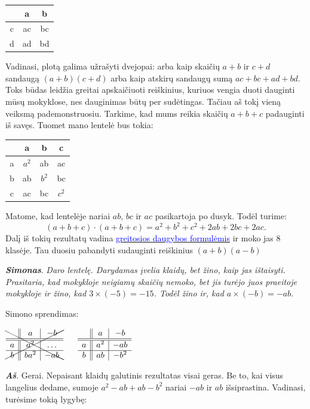 \documentclass[a4paper]{article}
\newcommand{\goto}[2]{\href{\detokenize{#1}}{\textcolor{blue}{#2}}}
\newcommand{\say}[1]{\textbf{\textit{#1}}}
\begin{document}
\begin{tabular}{c||c|c}
 & a & b \\ \hline \hline
 c & ac & bc\\ \hline 
 d & ad &bd
\end{tabular}

Vadinasi, plotą galima užrašyti dvejopai: arba kaip skaičių $a+b$ ir $c+d$ sandaugą $(a+b)(c+d)$ arba kaip atskirų sandaugų sumą $ac+bc+ad+bd$. Toks būdas leidžia greitai apskaičiuoti reiškinius, kuriuos vengia duoti dauginti mūsų mokyklose, nes dauginimas būtų per sudėtingas. Tačiau aš tokį vieną veiksmą pademonstruosiu. Tarkime, kad mums reikia skaičių $a+b+c$ padauginti iš savęs. Tuomet mano lentelė bus tokia:

\begin{tabular}{c||c|c|c}
 & a & b & c\\ \hline \hline
 a & $a^2$ & ab & ac\\ \hline 
 b & ab & $b^2$ & bc\\ \hline
 c & ac & bc & $c^2$
\end{tabular}

Matome, kad lentelėje nariai $ab$, $bc$ ir $ac$ pasikartoja po dusyk. Todėl turime: $$(a+b+c)\cdot (a+b+c) = a^2+b^2+c^2+2ab+2bc+2ac.$$ Dalį iš tokių rezultatų vadina \goto{https://www.ematematikas.lt/forumas/greitosios-daugybos-formules-t10771.html}{greitosios daugybos formulėmis} ir moko jas 8 klasėje. Tau duosiu pabandyti sudauginti reiškinius $(a+b)(a-b)$

\say{Simonas}. \textit{Daro lentelę. Darydamas įvelia klaidų, bet žino, kaip jas ištaisyti. Prasitaria, kad mokykloje neigiamų skaičių nemoko, bet jis turėjo juos praeitoje mokykloje ir žino, kad $3\times (-5) = -15$. Todėl žino ir, kad $a\times(-b)=-ab$}.

Simono sprendimas:

$\bcancel{\cancel{\begin{array}{c||c|c}
 & a & -b \\ \hline \hline
 a & a^2 & \dots \\ \hline 
 b & ba^2 & -ab
\end{array}}}\phantom{xxx} \begin{array}{c||c|c}
 & a & -b \\ \hline \hline
 a & a^2 & -ab\\ \hline 
 b & ab & -b^2
\end{array}$

\say{Aš}. Gerai. Nepaisant klaidų galutinis rezultatas visai geras. Be to, kai visus langelius dedame, sumoje $a^2-ab+ab-b^2$ nariai $-ab$ ir $ab$ išsiprastina. Vadinasi, turėsime tokią lygybę:
\end{document}

